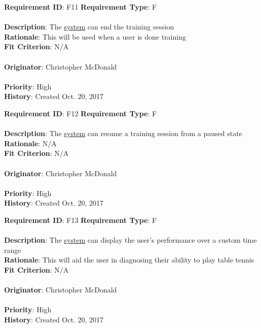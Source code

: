 \documentclass[11pt]{article}
\begin{document}
\begin{framed}
	\noindent\textbf{Requirement ID}: F11 \hfill \textbf{Requirement Type}: F \hfill\\\\
	\noindent\textbf{Description}: The \hyperref[sec:definitions]{system} can end the training session \\
	\textbf{Rationale}: This will be used when a user is done training \\
	\textbf{Fit Criterion}: N/A \\\\
	\textbf{Originator}: Christopher McDonald \\\\
	\textbf{Priority}: High \hfill \\
	\noindent\textbf{History}: Created Oct. 20, 2017
\end{framed}

\begin{framed}
	\noindent\textbf{Requirement ID}: F12 \hfill \textbf{Requirement Type}: F \hfill\\\\
	\noindent\textbf{Description}: The \hyperref[sec:definitions]{system} can resume a training session from a paused state \\
	\textbf{Rationale}: N/A \\
	\textbf{Fit Criterion}: N/A \\\\
	\textbf{Originator}: Christopher McDonald \\\\
	\textbf{Priority}: High \hfill \\
	\noindent\textbf{History}: Created Oct. 20, 2017
\end{framed}

\begin{framed}
	\noindent\textbf{Requirement ID}: F13 \hfill \textbf{Requirement Type}: F \hfill\\\\
	\noindent\textbf{Description}: The \hyperref[sec:definitions]{system} can display the user's performance over a custom time range \\
	\textbf{Rationale}: This will aid the user in diagnosing their ability to play table tennis \\
	\textbf{Fit Criterion}: N/A\\\\
	\textbf{Originator}: Christopher McDonald \\\\
	\textbf{Priority}: High \hfill \\
	\noindent\textbf{History}: Created Oct. 20, 2017
\end{framed}
\end{document}

